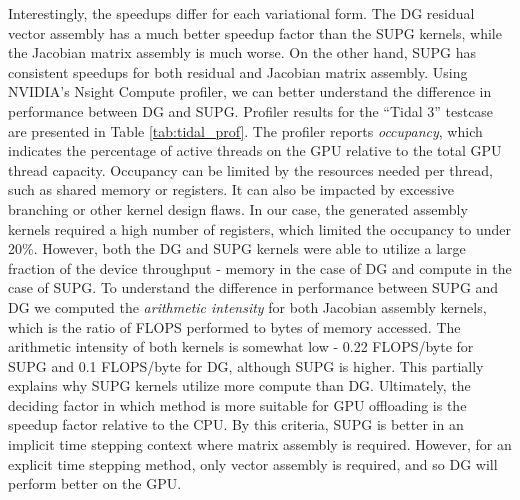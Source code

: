 Interestingly, the speedups differ for each variational form. The DG residual vector assembly has a much better speedup factor than the SUPG kernels, while the Jacobian matrix assembly is much worse. On the other hand, SUPG has consistent speedups for both residual and Jacobian matrix assembly.
Using NVIDIA's Nsight Compute profiler, we can better understand the difference in performance between DG and SUPG.
Profiler results for the ``Tidal 3'' testcase are presented in Table \ref{tab:tidal_prof}. The profiler reports \textit{occupancy}, which indicates the percentage of active threads on the GPU relative to the total GPU thread capacity. Occupancy can be limited by the resources needed per thread, such as shared memory or registers. It can also be impacted by excessive branching or other kernel design flaws. In our case, the generated assembly kernels required a high number of registers, which limited the occupancy to under 20\%. However, both the DG and SUPG kernels were able to utilize a large fraction of the device throughput - memory in the case of DG and compute in the case of SUPG. To understand the difference in performance between SUPG and DG we computed the \textit{arithmetic intensity} for both Jacobian assembly kernels, which is the ratio of FLOPS performed to bytes of memory accessed. The arithmetic intensity of both kernels is somewhat low - 0.22 FLOPS/byte for SUPG and 0.1 FLOPS/byte for DG, although SUPG is higher. This partially explains why SUPG kernels utilize more compute than DG. Ultimately, the deciding factor in which method is more suitable for GPU offloading is the speedup factor relative to the CPU. By this criteria, SUPG is better in an implicit time stepping context where matrix assembly is required. However, for an explicit time stepping method, only vector assembly is required, and so DG will perform better on the GPU.
